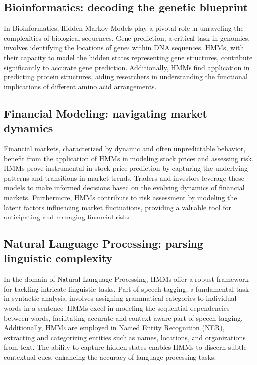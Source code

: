 \documentclass{englishreport}
\begin{document}
\subsection{Bioinformatics: decoding the genetic blueprint}

In Bioinformatics, Hidden Markov Models play a pivotal role in unraveling the complexities of biological sequences. Gene prediction, a critical task in genomics, involves identifying the locations of genes within DNA sequences. HMMs, with their capacity to model the hidden states representing gene structures, contribute significantly to accurate gene prediction. Additionally, HMMs find application in predicting protein structures, aiding researchers in understanding the functional implications of different amino acid arrangements.

\subsection{Financial Modeling: navigating market dynamics}

Financial markets, characterized by dynamic and often unpredictable behavior, benefit from the application of HMMs in modeling stock prices and assessing risk. HMMs prove instrumental in stock price prediction by capturing the underlying patterns and transitions in market trends. Traders and investors leverage these models to make informed decisions based on the evolving dynamics of financial markets. Furthermore, HMMs contribute to risk assessment by modeling the latent factors influencing market fluctuations, providing a valuable tool for anticipating and managing financial risks.

\subsection{Natural Language Processing: parsing linguistic complexity}

In the domain of Natural Language Processing, HMMs offer a robust framework for tackling intricate linguistic tasks. Part-of-speech tagging, a fundamental task in syntactic analysis, involves assigning grammatical categories to individual words in a sentence. HMMs excel in modeling the sequential dependencies between words, facilitating accurate and context-aware part-of-speech tagging. Additionally, HMMs are employed in Named Entity Recognition (NER), extracting and categorizing entities such as names, locations, and organizations from text. The ability to capture hidden states enables HMMs to discern subtle contextual cues, enhancing the accuracy of language processing tasks.
\end{document}

